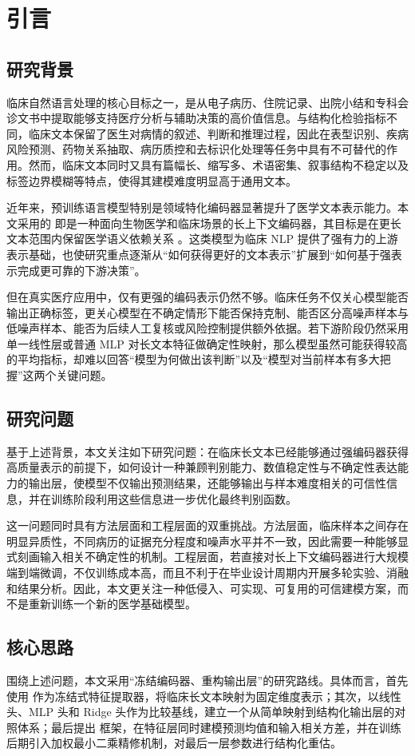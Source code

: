 \section{引言}
\subsection{研究背景}
临床自然语言处理的核心目标之一，是从电子病历、住院记录、出院小结和专科会诊文书中提取能够支持医疗分析与辅助决策的高价值信息。与结构化检验指标不同，临床文本保留了医生对病情的叙述、判断和推理过程，因此在表型识别、疾病风险预测、药物关系抽取、病历质控和去标识化处理等任务中具有不可替代的作用。然而，临床文本同时又具有篇幅长、缩写多、术语密集、叙事结构不稳定以及标签边界模糊等特点，使得其建模难度明显高于通用文本。

近年来，预训练语言模型特别是领域特化编码器显著提升了医学文本表示能力。本文采用的 \encoder{} 即是一种面向生物医学和临床场景的长上下文编码器，其目标是在更长文本范围内保留医学语义依赖关系 \citep{sounack2025bioclinicalmodernbertstateoftheartlongcontext}。这类模型为临床 NLP 提供了强有力的上游表示基础，也使研究重点逐渐从“如何获得更好的文本表示”扩展到“如何基于强表示完成更可靠的下游决策”。

但在真实医疗应用中，仅有更强的编码表示仍然不够。临床任务不仅关心模型能否输出正确标签，更关心模型在不确定情形下能否保持克制、能否区分高噪声样本与低噪声样本、能否为后续人工复核或风险控制提供额外依据。若下游阶段仍然采用单一线性层或普通 MLP 对长文本特征做确定性映射，那么模型虽然可能获得较高的平均指标，却难以回答“模型为何做出该判断”以及“模型对当前样本有多大把握”这两个关键问题。

\subsection{研究问题}
基于上述背景，本文关注如下研究问题：在临床长文本已经能够通过强编码器获得高质量表示的前提下，如何设计一种兼顾判别能力、数值稳定性与不确定性表达能力的输出层，使模型不仅输出预测结果，还能够输出与样本难度相关的可信性信息，并在训练阶段利用这些信息进一步优化最终判别函数。

这一问题同时具有方法层面和工程层面的双重挑战。方法层面，临床样本之间存在明显异质性，不同病历的证据充分程度和噪声水平并不一致，因此需要一种能够显式刻画输入相关不确定性的机制。工程层面，若直接对长上下文编码器进行大规模端到端微调，不仅训练成本高，而且不利于在毕业设计周期内开展多轮实验、消融和结果分析。因此，本文更关注一种低侵入、可实现、可复用的可信建模方案，而不是重新训练一个新的医学基础模型。

\subsection{核心思路}
围绕上述问题，本文采用“冻结编码器、重构输出层”的研究路线。具体而言，首先使用 \encoder{} 作为冻结式特征提取器，将临床长文本映射为固定维度表示；其次，以线性头、MLP 头和 Ridge 头作为比较基线，建立一个从简单映射到结构化输出层的对照体系；最后提出 \method{} 框架，在特征层同时建模预测均值和输入相关方差，并在训练后期引入加权最小二乘精修机制，对最后一层参数进行结构化重估。

